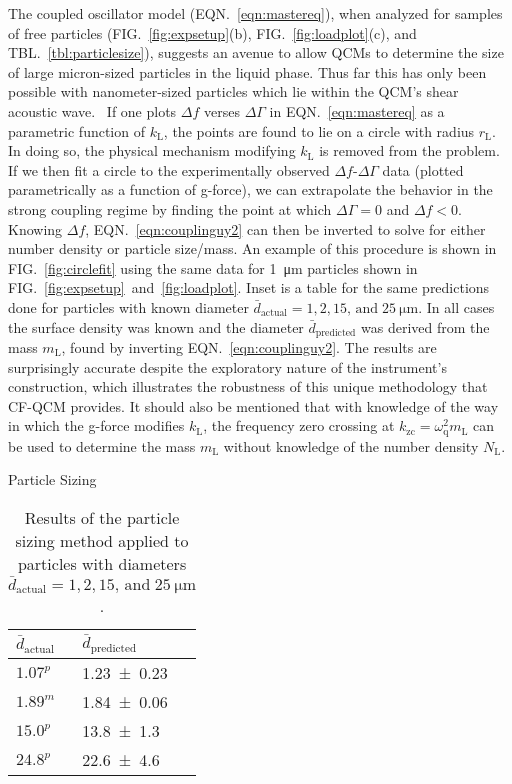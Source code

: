 \documentclass[floatfix,superscriptaddress,a4paper,twocolumn]{revtex4-1}
\newcommand{\Figure}[1]{FIG.~\ref{#1}}
\newcommand{\Figures}[2]{FIG.~\ref{#1}~and~\ref{#2}}
\newcommand{\Equation}[1]{EQN.~\ref{#1}}
\newcommand{\Table}[1]{TBL.~\ref{#1}}
\newcommand{\df}{\Delta\!f}
\newcommand{\dg}{\Delta\Gamma}
\newcommand{\kl}{k_\mathrm{L}}
\newcommand{\ml}{m_\mathrm{L}}
\newcommand{\omegaq}{\omega_\mathrm{q}}
\begin{document}
The coupled oscillator model (\Equation{eqn:mastereq}), when analyzed for
samples of free particles (\Figure{fig:expsetup}(b),
\Figure{fig:loadplot}(c), and \Table{tbl:particlesize}), suggests an avenue
to allow QCMs to determine the size of large micron-sized particles in the
liquid phase.  Thus far this has only been possible with nanometer-sized
particles which lie within the QCM's shear acoustic
wave.~\cite{olsson2013using}  If one plots $\df$ verses $\dg$ in
\Equation{eqn:mastereq} as a parametric function of $\kl$, the points are
found to lie on a circle with radius $r_\mathrm{L}$.  In doing so, the physical
mechanism modifying $\kl$ is removed from the problem.
If we then fit a
circle to the experimentally observed $\df$-$\dg$ data (plotted
parametrically as a function of g-force), we can extrapolate the behavior
in the strong coupling regime by finding the point at which $\dg=0$ and
$\df<0$.  Knowing $\df$, \Equation{eqn:couplinguy2} can then be inverted to
solve for either number density or particle size/mass.  An example of this
procedure is shown in \Figure{fig:circlefit} using the same data for
\SI{1}{\micro\meter} particles shown in
\Figures{fig:expsetup}{fig:loadplot}.  Inset is a table for the same
predictions done for particles with known diameter
$\bar{d}_\mathrm{actual}=1, 2, 15,\,\mathrm{and}\;\SI{25}{\micro\meter}$.
In all cases the surface density was known and the diameter
$\bar{d}_\text{predicted}$ was derived from the mass $\ml$, found by
inverting \Equation{eqn:couplinguy2}.  The results are surprisingly accurate
despite the exploratory nature of the instrument's construction, which
illustrates the robustness of this unique methodology that CF-QCM
provides.
It should also be mentioned that with knowledge of the way in which the
g-force modifies $\kl$, the frequency zero crossing at
$k_\mathrm{zc}=\omegaq^2\ml$ can be used to determine the mass $\ml$
without knowledge of the number density $N_\mathrm{L}$. 
\begin{table}[ht]
\centering
Particle Sizing\\
 \begin{tabularx}{80pt}{XX}
 \toprule
 $\bar{d}_\mathrm{actual}$ & $\bar{d}_\mathrm{predicted}$ \\
 \midrule
  $1.07^p$ & \num{1.23+-0.23} \\
  $1.89^m$ & \num{1.84+-0.06} \\
  $15.0^p$ & \num{13.8+-1.3} \\
  $24.8^p$ & \num{22.6+-4.6} \\
 \bottomrule
\end{tabularx}
\caption{Results of the particle sizing method applied to particles with diameters
$\bar{d}_\mathrm{actual}=1, 2, 15,\,\mathrm{and}\;\SI{25}{\micro\meter}$.}
\label{tbl:particlesizing}
\end{table}
\end{document}
